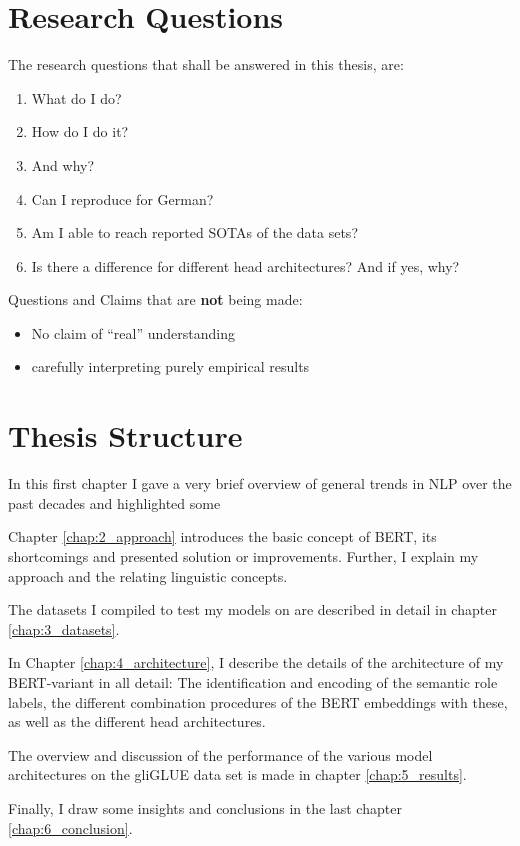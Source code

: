 \section{Research Questions}

The research questions that shall be answered in this thesis, are:
\begin{enumerate}
 \item What do I do?
 \item How do I do it?
 \item And why?
  \item Can I reproduce \cite{zhang2019semantics} for German?
  \item Am I able to reach reported SOTAs of the data sets?
  \item Is there a difference for different head architectures? And if yes, why?
\end{enumerate}

Questions and Claims that are \textbf{not} being made:

\begin{itemize}
  \item No claim of ``real'' understanding
  \item carefully interpreting purely empirical results
\end{itemize}



\section{Thesis Structure}

In this first chapter I gave a very brief overview of general trends in
NLP over the past decades and highlighted some

Chapter \ref{chap:2_approach} introduces the basic concept of BERT,
its {\color{red} shortcomings} and presented solution or improvements. Further,
I explain my approach and the relating linguistic concepts.

The datasets I compiled to test my models on are described in detail
in chapter \ref{chap:3_datasets}.

In Chapter \ref{chap:4_architecture}, I describe the details of the architecture of
my BERT-variant in all detail: The identification and encoding of the semantic role
labels, the different combination procedures of the BERT embeddings with these, as
well as the different head architectures.

The overview and discussion of the performance of the various model architectures on
the gliGLUE data set is made in chapter \ref{chap:5_results}.

Finally, I draw some insights and conclusions in the last chapter \ref{chap:6_conclusion}.

